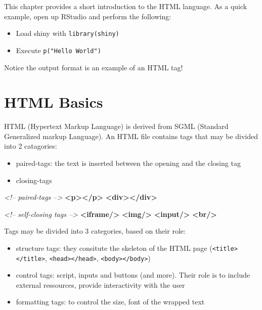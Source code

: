 \documentclass[
]{book}
\newenvironment{Shaded}{\begin{snugshade}}{\end{snugshade}}
\newcommand{\CommentTok}[1]{\textcolor[rgb]{0.56,0.35,0.01}{\textit{#1}}}
\newcommand{\KeywordTok}[1]{\textcolor[rgb]{0.13,0.29,0.53}{\textbf{#1}}}
\providecommand{\tightlist}{%
  \setlength{\itemsep}{0pt}\setlength{\parskip}{0pt}}
\begin{document}
This chapter provides a short introduction to the HTML language. As a quick example, open up RStudio and perform the following:

\begin{itemize}
\tightlist
\item
  Load shiny with \texttt{library(shiny)}
\item
  Execute \texttt{p("Hello\ World")}
\end{itemize}

Notice the output format is an example of an HTML tag!

\hypertarget{html-basics}{%
\section{HTML Basics}\label{html-basics}}

HTML (Hypertext Markup Language) is derived from SGML (Standard Generalized markup Language). An HTML file contains tags that may be divided into 2 catagories:

\begin{itemize}
\tightlist
\item
  paired-tags: the text is inserted between the opening and the closing tag
\item
  closing-tags
\end{itemize}

\begin{Shaded}
\begin{Highlighting}[]
\CommentTok{<!-- paired-tags -->}
\KeywordTok{<p></p>}
\KeywordTok{<div></div>}

\CommentTok{<!-- self-closing tags -->}
\KeywordTok{<iframe/>}
\KeywordTok{<img/>}
\KeywordTok{<input/>}
\KeywordTok{<br/>}
\end{Highlighting}
\end{Shaded}

Tags may be divided into 3 categories, based on their role:

\begin{itemize}
\tightlist
\item
  structure tags: they consitute the skeleton of the HTML page (\texttt{\textless{}title\textgreater{}\textless{}/title\textgreater{}}, \texttt{\textless{}head\textgreater{}\textless{}/head\textgreater{}}, \texttt{\textless{}body\textgreater{}\textless{}/body\textgreater{}})
\item
  control tags: script, inputs and buttons (and more). Their role is to include external ressources, provide interactivity with the user
\item
  formatting tags: to control the size, font of the wrapped text
\end{itemize}
\end{document}
